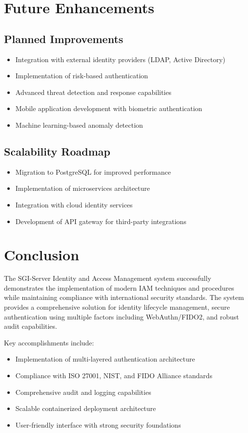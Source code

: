 \documentclass[12pt,a4paper]{article}
\begin{document}
\section{Future Enhancements}

\subsection{Planned Improvements}
\begin{itemize}
    \item Integration with external identity providers (LDAP, Active Directory)
    \item Implementation of risk-based authentication
    \item Advanced threat detection and response capabilities
    \item Mobile application development with biometric authentication
    \item Machine learning-based anomaly detection
\end{itemize}

\subsection{Scalability Roadmap}
\begin{itemize}
    \item Migration to PostgreSQL for improved performance
    \item Implementation of microservices architecture
    \item Integration with cloud identity services
    \item Development of API gateway for third-party integrations
\end{itemize}

\section{Conclusion}

The SGI-Server Identity and Access Management system successfully demonstrates the implementation of modern IAM techniques and procedures while maintaining compliance with international security standards. The system provides a comprehensive solution for identity lifecycle management, secure authentication using multiple factors including WebAuthn/FIDO2, and robust audit capabilities.

Key accomplishments include:
\begin{itemize}
    \item Implementation of multi-layered authentication architecture
    \item Compliance with ISO 27001, NIST, and FIDO Alliance standards
    \item Comprehensive audit and logging capabilities
    \item Scalable containerized deployment architecture
    \item User-friendly interface with strong security foundations
\end{itemize}
\end{document}
